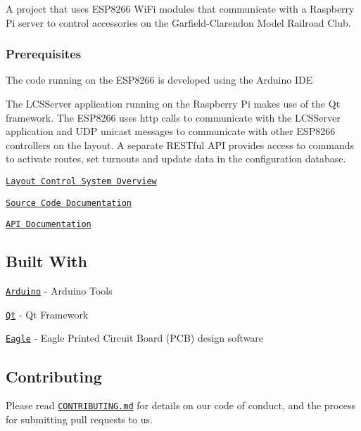 A project that uses E\+S\+P8266 Wi\+Fi modules that communicate with a Raspberry Pi server to control accessories on the Garfield-\/\+Clarendon Model Railroad Club.

\subsubsection*{Prerequisites}

The code running on the E\+S\+P8266 is developed using the Arduino I\+DE

The L\+C\+S\+Server application running on the Raspberry Pi makes use of the Qt framework. The E\+S\+P8266 uses http calls to communicate with the L\+C\+S\+Server application and U\+DP unicast messages to communicate with other E\+S\+P8266 controllers on the layout. A separate R\+E\+S\+Tful A\+PI provides access to commands to activate routes, set turnouts and update data in the configuration database.

\href{https://github.com/garfieldclarendon/garfieldclarendon.github.io/blob/master/html/Documents/LCSOverview.pdf}{\tt Layout Control System Overview}

\href{https://garfieldclarendon.github.io/html/index.html}{\tt Source Code Documentation}

\href{https://garfieldclarendon.github.io/apidoc/index.html}{\tt A\+PI Documentation}

\subsection*{Built With}


\begin{DoxyItemize}
\item \href{https://www.arduino.cc/en/Main/Software}{\tt Arduino} -\/ Arduino Tools
\item \href{https://www.qt.io/}{\tt Qt} -\/ Qt Framework
\item \href{https://www.autodesk.com/products/eagle/overview}{\tt Eagle} -\/ Eagle Printed Circuit Board (P\+CB) design software
\end{DoxyItemize}

\subsection*{Contributing}

Please read \href{https://gist.github.com/PurpleBooth/b24679402957c63ec426}{\tt C\+O\+N\+T\+R\+I\+B\+U\+T\+I\+N\+G.\+md} for details on our code of conduct, and the process for submitting pull requests to us.

